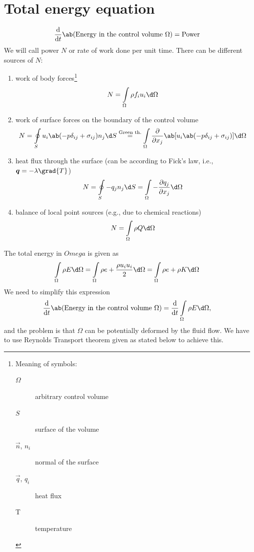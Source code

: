 \documentclass[justified, nobib,a4paper]{tufte-handout}
\begin{document}
\section{Total energy equation}
\[
  \odv{}{t}\ab(\text{Energy in the control volume } \Omega) = \text{Power}
\]
We will call power \(N\) or rate of work done per unit time. There can be
different sources of \(N\):
\begin{enumerate}
  \item work of body forces\footnote{%
      Meaning of symbols:
        \begin{description}
          \item[\(\Omega\)] arbitrary control volume
          \item[\(S\)] surface of the volume
          \item[\(\vec{n}\), \(n_i\)] normal of the surface
          \item[\(\vec{q}\), \(q_i\)] heat flux
          \item[T] temperature
        \end{description}
      } 
    \[
      N = \int\limits_\Omega\rho f_i u_i \d \Omega
    \]
  \item work of surface forces on the boundary of the control volume
    \[
      N = \oint\limits_S u_i\ab(-p\delta_{ij} + \sigma_{ij})n_j \d S \stackrel{\text{Green th.}}{=}
      \int\limits_\Omega \pdv{}{x_j}\ab[u_i\ab(-p\delta_{ij} + \sigma_{ij})] \d \Omega
    \]
  \item heat flux through the surface (can be according to Fick's law, i.e.,
    \(\vec{q} = -\lambda\grad{T}\))
    \[
      N = \oint\limits_S - q_j n_j \d S = \int\limits_\Omega -\pdv{q_j}{x_j}\d \Omega 
    \]
  \item balance of local point sources (e.g., due to chemical reactions)
    \[
      N = \int\limits_\Omega \rho Q \d \Omega
    \]
\end{enumerate}
The total energy in \(Omega\) is given as 
\[
  \int\limits_\Omega \rho E \d \Omega 
  = \int\limits_\Omega \rho e + \frac{\rho u_i u_i}{2} \d \Omega 
  = \int\limits_\Omega \rho e + \rho K \d \Omega 
\]
We need to simplify this expression 
\[
  \odv{}{t}\ab(\text{Energy in the control volume } \Omega) = 
  \odv{}{t}\int\limits_\Omega \rho E \d \Omega,
\]
and the problem is that \(\Omega\) can be potentially deformed by the fluid flow. 
We have to use Reynolds Transport theorem given as stated below to achieve
this.
\end{document}
